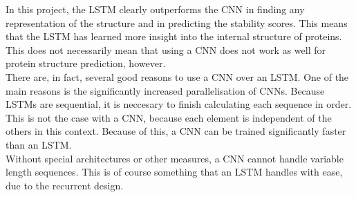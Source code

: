 In this project, the LSTM clearly outperforms the CNN in finding any representation of the structure and in predicting the stability scores. This means that the LSTM has learned more insight into the internal structure of proteins. This does not necessarily mean that using a CNN does not work as well for protein structure prediction, however.\\

\noindent
There are, in fact, several good reasons to use a CNN over an LSTM. One of the main reasons is the significantly increased parallelisation of CNNs. Because LSTMs are sequential, it is neccesary to finish calculating each sequence in order. This is not the case with a CNN, because each element is independent of the others in this context. Because of this, a CNN can be trained significantly faster than an LSTM.\\

\noindent
Without special architectures or other measures, a CNN cannot handle variable length sequences. This is of course something that an LSTM handles with ease, due to the recurrent design.



